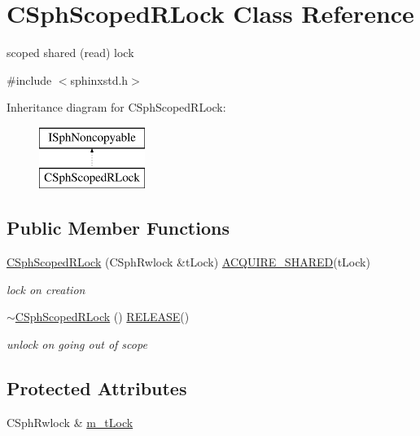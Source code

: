\hypertarget{classCSphScopedRLock}{\section{C\-Sph\-Scoped\-R\-Lock Class Reference}
\label{classCSphScopedRLock}
}


scoped shared (read) lock  




{\ttfamily \#include $<$sphinxstd.\-h$>$}

Inheritance diagram for C\-Sph\-Scoped\-R\-Lock\-:\begin{figure}[H]
\begin{center}
\leavevmode
\includegraphics[height=2.000000cm]{classCSphScopedRLock}
\end{center}
\end{figure}
\subsection*{Public Member Functions}
\begin{DoxyCompactItemize}
\item 
\hyperlink{classCSphScopedRLock_a33f25637db5a8986792afa296c60cd9f}{C\-Sph\-Scoped\-R\-Lock} (C\-Sph\-Rwlock \&t\-Lock) \hyperlink{sphinxstd_8h_a03538b67a3c435c72dd463ab234b1913}{A\-C\-Q\-U\-I\-R\-E\-\_\-\-S\-H\-A\-R\-E\-D}(t\-Lock)
\begin{DoxyCompactList}\small\item\em lock on creation \end{DoxyCompactList}\item 
\hyperlink{classCSphScopedRLock_a71b498e182827dd336f1538e50bbefa8}{$\sim$\-C\-Sph\-Scoped\-R\-Lock} () \hyperlink{sphinxstd_8h_a59a3415d4063936405dfca342973c2ea}{R\-E\-L\-E\-A\-S\-E}()
\begin{DoxyCompactList}\small\item\em unlock on going out of scope \end{DoxyCompactList}\end{DoxyCompactItemize}
\subsection*{Protected Attributes}
\begin{DoxyCompactItemize}
\item 
C\-Sph\-Rwlock \& \hyperlink{classCSphScopedRLock_a18b614334ad1b2c861b5368c6665a518}{m\-\_\-t\-Lock}
\end{DoxyCompactItemize}
